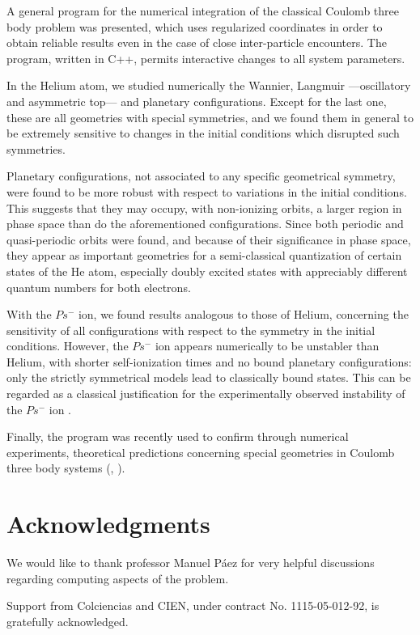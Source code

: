 \documentclass[thmsa]{article}
\begin{document}
A general program for the numerical integration of the classical Coulomb
three body problem was presented, which uses regularized coordinates in
order to obtain reliable results even in the case of close inter-particle
encounters. The program, written in C++, permits interactive changes to all
system parameters.

In the Helium atom, we studied numerically the Wannier, Langmuir
---oscillatory and asymmetric top--- and planetary configurations. Except
for the last one, these are all geometries with special symmetries, and we
found them in general to be extremely sensitive to changes in the initial
conditions which disrupted such symmetries.

Planetary configurations, not associated to any specific geometrical
symmetry, were found to be more robust with respect to variations in the
initial conditions. This suggests that they may occupy, with non-ionizing
orbits, a larger region in phase space than do the aforementioned
configurations. Since both periodic and quasi-periodic orbits were found,
and because of their significance in phase space, they appear as important
geometries for a semi-classical quantization of certain states of the He
atom, especially doubly excited states with appreciably different quantum
numbers for both electrons.

With the $Ps^{-}$ ion, we found results analogous to those of Helium,
concerning the sensitivity of all configurations with respect to the
symmetry in the initial conditions. However, the $Ps^{-}$ ion appears
numerically to be unstabler than Helium, with shorter self-ionization times
and no bound planetary configurations: only the strictly symmetrical models
lead to classically bound states. This can be regarded as a classical
justification for the experimentally observed instability of the $Ps^{-}$
ion \cite{Mills}.

Finally, the program was recently used to confirm through numerical
experiments, theoretical predictions concerning special geometries in
Coulomb three body systems (\cite{Santander}, \cite{Sant-Mahe}).

\section{Acknowledgments}

We would like to thank professor Manuel P\'aez for very helpful discussions
regarding computing aspects of the problem.

Support from Colciencias and CIEN, under contract No. 1115-05-012-92, is
gratefully acknowledged.
\end{document}
